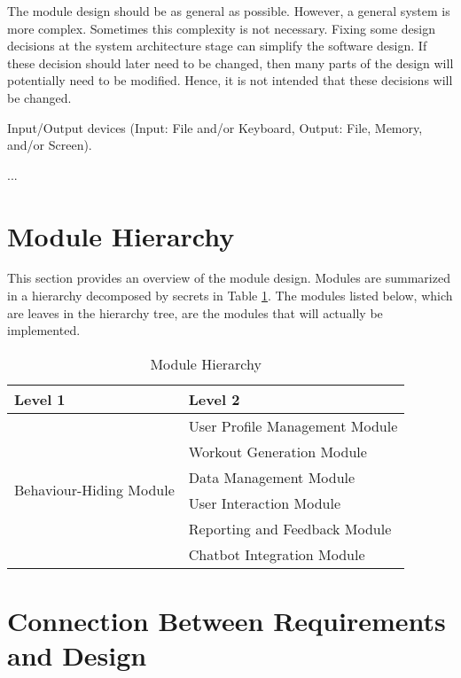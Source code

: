 \documentclass[12pt, titlepage]{article}
\newcounter{ucnum}
\newcommand{\uctheucnum}{UC\theucnum}
\begin{document}
The module design should be as general as possible. However, a general system is
more complex. Sometimes this complexity is not necessary. Fixing some design
decisions at the system architecture stage can simplify the software design. If
these decision should later need to be changed, then many parts of the design
will potentially need to be modified. Hence, it is not intended that these
decisions will be changed.

\begin{description}
\item[ \uctheucnum \label{ucIO}:] Input/Output devices
  (Input: File and/or Keyboard, Output: File, Memory, and/or Screen).
\item ...
\end{description}

\section{Module Hierarchy} \label{SecMH}

This section provides an overview of the module design. Modules are summarized
in a hierarchy decomposed by secrets in Table \ref{TblMH}. The modules listed
below, which are leaves in the hierarchy tree, are the modules that will
actually be implemented.


\begin{table}[h!]
\centering
\begin{tabular}{p{} p{}}
\toprule
\textbf{Level 1} & \textbf{Level 2}\\
\midrule

\multirow{7}{0.3\textwidth}{Behaviour-Hiding Module} 
& User Profile Management Module\\
& Workout Generation Module\\
& Data Management Module\\
& User Interaction Module\\
& Reporting and Feedback Module\\
& Chatbot Integration Module\\ 
\midrule

\end{tabular}
\caption{Module Hierarchy}
\label{TblMH}
\end{table}

\newpage
\section{Connection Between Requirements and Design} \label{SecConnection}
\end{document}
